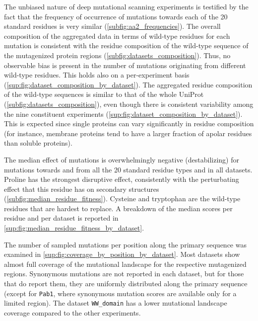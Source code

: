 The unbiased nature of deep mutational scanning experiments is testified by the fact that the frequency of occurrence of mutations towards each of the \num{20} standard residues is very similar (\autoref{subfig:aa2_frequencies}).
The overall composition of the aggregated data in terms of wild-type residues for each mutation is consistent with the residue composition of the wild-type sequence of the mutagenized protein regions (\autoref{subfig:datasets_composition}).
Thus, no observable bias is present in the number of mutations originating from different wild-type residues.
This holds also on a per-experiment basis (\autoref{sup:fig:dataset_composition_by_dataset}).
The aggregated residue composition of the wild-type sequences is similar to that of the whole UniProt (\autoref{subfig:datasets_composition}), even though there is consistent variability among the nine constituent experiments (\autoref{sup:fig:dataset_composition_by_dataset}).
This is expected since single proteins can vary significantly in residue composition (for instance, membrane proteins tend to have a larger fraction of apolar residues than soluble proteins).

The median effect of mutations is overwhelmingly negative (destabilizing) for mutations towards and from all the \num{20} standard residue types and in all datasets.
Proline has the strongest disruptive effect, consistently with the perturbating effect that this residue has on secondary structures (\autoref{subfig:median_residue_fitness}).
Cysteine and tryptophan are the wild-type residues that are hardest to replace.
A breakdown of the median scores per residue and per dataset is reported in \autoref{sup:fig:median_residue_fitness_by_dataset}.

The number of sampled mutations per position along the primary sequence was examined in \autoref{sup:fig:coverage_by_position_by_dataset}.
Most datasets show almost full coverage of the mutational landscape for the respective mutagenized regions.
Synonymous mutations are not reported in each dataset, but for those that do report them, they are uniformly distributed along the primary sequence (except for \texttt{Pab1}, where synonymous mutation scores are available only for a limited region).
The dataset \texttt{WW\_domain} has a lower mutational landscape coverage compared to the other experiments.

